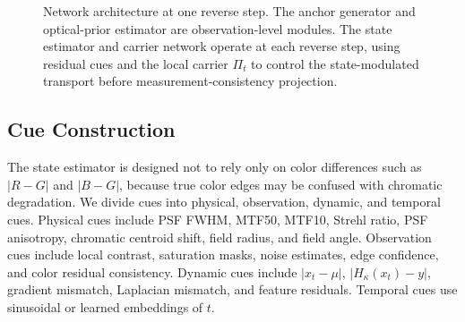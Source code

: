\documentclass[journal]{IEEEtran}
\newcommand{\hk}{H_{\kappa}}
\begin{document}
\begin{figure}[t]
\centering
{}
\caption{Network architecture at one reverse step. The anchor generator and optical-prior estimator are observation-level modules. The state estimator and carrier network operate at each reverse step, using residual cues and the local carrier $\Pi_t$ to control the state-modulated transport before measurement-consistency projection.}
\label{fig:architecture}
\end{figure}

\subsection{Cue Construction}
The state estimator is designed not to rely only on color differences such as $|R-G|$ and $|B-G|$, because true color edges may be confused with chromatic degradation. We divide cues into physical, observation, dynamic, and temporal cues. Physical cues include PSF FWHM, MTF50, MTF10, Strehl ratio, PSF anisotropy, chromatic centroid shift, field radius, and field angle. Observation cues include local contrast, saturation masks, noise estimates, edge confidence, and color residual consistency. Dynamic cues include $|x_t-\mu|$, $|\hk(x_t)-y|$, gradient mismatch, Laplacian mismatch, and feature residuals. Temporal cues use sinusoidal or learned embeddings of $t$.
\end{document}
